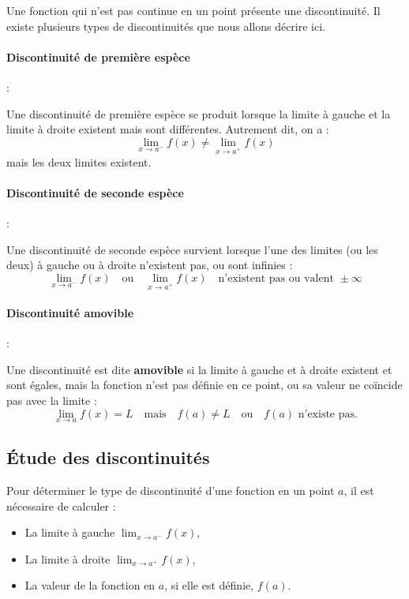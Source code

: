\documentclass{article}
\begin{document}
	Une fonction qui n'est pas continue en un point présente une discontinuité. Il existe plusieurs types de discontinuités que nous allons décrire ici.
	
	\paragraph{Discontinuité de première espèce} : 
	
	Une discontinuité de première espèce se produit lorsque la limite à gauche et la limite à droite existent mais sont différentes. Autrement dit, on a :
	\[
	\lim_{x \to a^-} f(x) \neq \lim_{x \to a^+} f(x)
	\]
	mais les deux limites existent.
	
	\paragraph{Discontinuité de seconde espèce} : 
	
	Une discontinuité de seconde espèce survient lorsque l'une des limites (ou les deux) à gauche ou à droite n'existent pas, ou sont infinies :
	\[
	\lim_{x \to a^-} f(x) \quad \text{ou} \quad \lim_{x \to a^+} f(x) \quad \text{n'existent pas ou valent } \pm \infty
	\]
	
	\paragraph{Discontinuité amovible} : 
	
	Une discontinuité est dite \textbf{amovible} si la limite à gauche et à droite existent et sont égales, mais la fonction n'est pas définie en ce point, ou sa valeur ne coïncide pas avec la limite :
	\[
	\lim_{x \to a} f(x) = L \quad \text{mais} \quad f(a) \neq L \quad \text{ou} \quad f(a) \text{ n'existe pas.}
	\]
	
	\subsection{Étude des discontinuités}
	
	Pour déterminer le type de discontinuité d'une fonction en un point \( a \), il est nécessaire de calculer :
	\begin{itemize}
		\item La limite à gauche \( \lim_{x \to a^-} f(x) \),
		\item La limite à droite \( \lim_{x \to a^+} f(x) \),
		\item La valeur de la fonction en \( a \), si elle est définie, \( f(a) \).
	\end{itemize}
	
\end{document}
